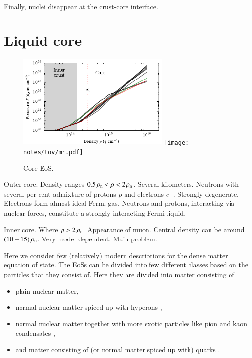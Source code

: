 Finally, nuclei disappear at the crust-core interface.





\section{Liquid core}\label{sect:core}
\begin{figure}
\centering
\includegraphics[width=7.5cm]{notes/eos/dense_eos.pdf}
\texttt{[image: notes/tov/mr.pdf]}
\caption{\label{fig:core}
Core EoS.
}
\end{figure}

Outer core.
Density ranges $0.5 \, \rho_{\mathrm{n}}  < \rho < 2\, \rho_{\mathrm{n}} $.
Several kilometers.
Neutrons with several per cent admixture of protons $p$ and electrons $e^{-}$.
Strongly degenerate.
Electrons form almost ideal Fermi gas.
Neutrons and protons, interacting via nuclear forces, constitute a strongly interacting Fermi liquid.

Inner core.
Where $\rho > 2\, \rho_{\mathrm{n}} $.
Appearance of muon.
Central density can be around $(10-15)\, \rho_{\mathrm{n}} $.
Very model dependent.
Main problem.

Here we consider few (relatively) modern descriptions for the dense matter equation of state.
The EoSs can be divided into few different classes based on the particles that they consist of.
Here they are divided into matter consisting of
\begin{itemize}
    \item plain \npem nuclear matter, 
    \item normal nuclear matter spiced up with hyperons \hyperon,
    \item normal nuclear matter together with more exotic particles like pion and kaon condensates \pikaon,
    \item and matter consisting of (or normal matter spiced up with) quarks \quark.
\end{itemize}

